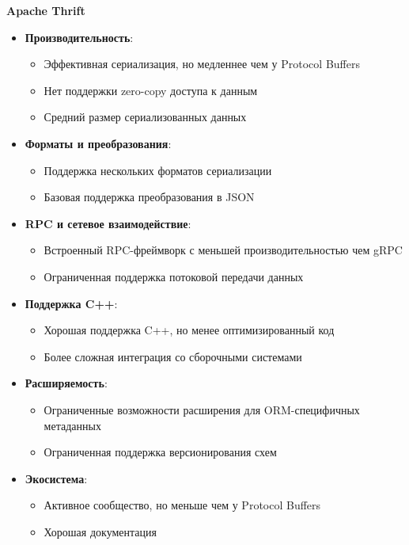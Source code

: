         \textbf{Apache Thrift}

            \begin{itemize}
                \item \textbf{Производительность}:
                \begin{itemize}
                    \item Эффективная сериализация, но медленнее чем у Protocol Buffers
                    \item Нет поддержки zero-copy доступа к данным
                    \item Средний размер сериализованных данных
                \end{itemize}

                \item \textbf{Форматы и преобразования}:
                \begin{itemize}
                    \item Поддержка нескольких форматов сериализации
                    \item Базовая поддержка преобразования в JSON
                \end{itemize}

                \item \textbf{RPC и сетевое взаимодействие}:
                \begin{itemize}
                    \item Встроенный RPC-фреймворк с меньшей производительностью чем gRPC
                    \item Ограниченная поддержка потоковой передачи данных
                \end{itemize}

                \item \textbf{Поддержка C++}:
                \begin{itemize}
                    \item Хорошая поддержка C++, но менее оптимизированный код
                    \item Более сложная интеграция со сборочными системами
                \end{itemize}

                \item \textbf{Расширяемость}:
                \begin{itemize}
                    \item Ограниченные возможности расширения для ORM-специфичных метаданных
                    \item Ограниченная поддержка версионирования схем
                \end{itemize}

                \item \textbf{Экосистема}:
                \begin{itemize}
                    \item Активное сообщество, но меньше чем у Protocol Buffers
                    \item Хорошая документация
                \end{itemize}
            \end{itemize}

